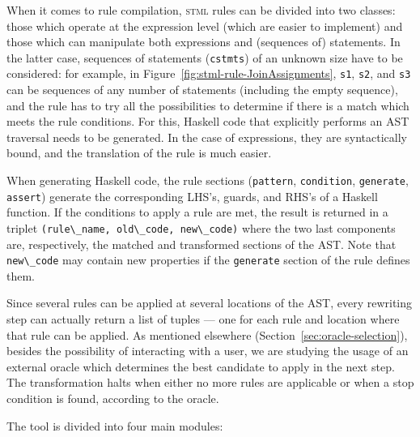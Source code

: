 \documentclass[svgnames,usenames,preprint,nocopyrightspace]{sigplanconf}
\newcommand{\ihaskell}[1]{\lstinline[style=hstyle,basicstyle={\small\ttfamily}]{#1}}
\newcommand{\stml}{\textsc{stml}\xspace}
\begin{document}
When it comes to rule compilation, \stml rules can be divided into two
classes: those which operate at the expression level (which are easier
to implement) and those which can manipulate both expressions and
(sequences of) statements.  In the latter case, sequences of
statements (\texttt{cstmts}) of an unknown size have to be considered:
for example, in Figure~\ref{fig:stml-rule-JoinAssignments},
\texttt{s1}, \texttt{s2}, and \texttt{s3} can be sequences of any
number of statements (including the empty sequence), and the rule has
to try all the possibilities to determine if there is a match which
meets the rule conditions. For this, Haskell code that explicitly
performs an AST traversal needs to be generated.  In the case of
expressions, they are syntactically bound, and the translation of the
rule is much easier.


When generating Haskell code, the rule sections (\texttt{pattern},
\texttt{condition}, \texttt{generate}, \texttt{assert}) generate the 
corresponding LHS's, guards, and RHS's of a Haskell function.
If the conditions to apply a rule are met, the result is returned in a
triplet \ihaskell{(rule\_name, old\_code, new\_code)} where the two
last components are, respectively, the matched and transformed
sections of the AST.  Note that \ihaskell{new\_code} may contain new
properties if the \texttt{generate} section of the rule defines them.

Since several rules can be applied at several locations of the AST,
every rewriting step can actually return a list of tuples --- one for
each rule
and location where that rule can be applied.  As mentioned elsewhere
(Section~\ref{sec:oracle-selection}), besides the possibility of
interacting with a user, we are studying the usage of an external oracle
which 
determines the best candidate to apply in the next step.  The
transformation halts when either no more rules are
applicable or when a stop condition is found, according to the
oracle. 


The tool is divided into four main modules: 
\end{document}

